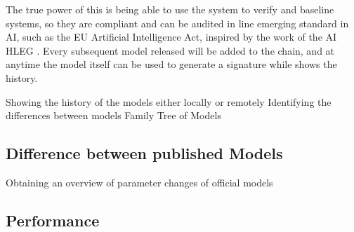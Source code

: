 The true power of this is being able to use the system to verify and baseline systems, so they are compliant and can be audited in line emerging standard in AI, such as the EU Artificial Intelligence Act, inspired by the work of the AI HLEG \cite{high-level_expert_group_on_ai_ethics_2019}. Every subsequent model released will be added to the chain, and at anytime the model itself can be used to generate a signature while shows the history.

    Showing the history of the models either locally or remotely
    Identifying the differences between models
    Family Tree of Models

\subsection{Difference between published Models}
    Obtaining an overview of parameter changes of official models

\subsection{Performance}






